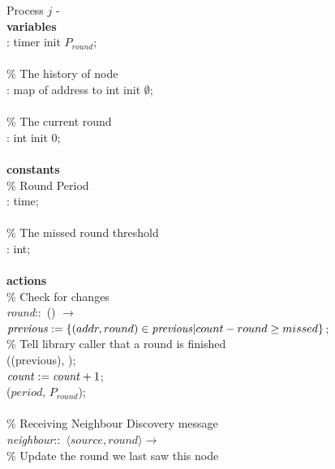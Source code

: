 \begin{figure}[H]
  \centering
  \begin{boxedminipage}{\linewidth}
    \null Process $j$ - \\
    \null \textbf{variables}\\
    \null\qq {}: timer init $P_{round}$;\\~\\
    \null\qq \% The history of node\\
    \null\qq {}: map of address to int init $\emptyset$;\\~\\
    \null\qq \% The current round\\
    \null\qq {}: int init 0;\\~\\
    \null \textbf{constants}\\
    \null\qq \% Round Period\\
    \null\qq {}: time;\\~\\
    \null\qq \% The missed round threshold\\
    \null\qq {}: int;\\~\\
    \null \textbf{actions}\\
    \null\qq \% Check for changes\\
    \null\qq \emph{round}::~() $\rightarrow$\\
    \null\qq\qq $\mbox{\emph{previous}} \mathrel{:=} \{ (addr, round) \in \mbox{\emph{previous}} | count - round \geq missed \}$;\\
    \null\qq\qq \% Tell library caller that a round is finished\\
    \null\qq\qq {}((previous), );\\
    \null\qq\qq $\mbox{\emph{count}} \mathrel{:=} \mbox{\emph{count}} + 1$; \\
    \null\qq\qq {}($\mathit{period}$, $P_{round}$); \\~\\
    \null\qq \% Receiving Neighbour Discovery message\\
    \null\qq \emph{neighbour}::~$\langle source, round\rangle \rightarrow$\\
    \null\qq\qq \% Update the round we last saw this node\\

\end{boxedminipage}
\end{figure}
